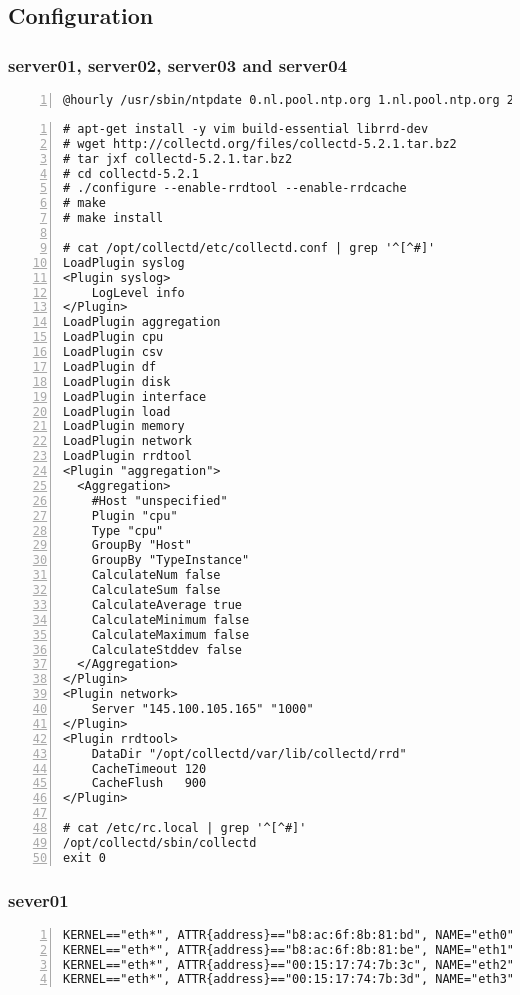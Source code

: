 \documentclass[Configuration]{subfiles}
\begin{document}
\newpage
\subsection{Configuration}
\label{sec:Configuration}

\subsubsection{server01, server02, server03 and server04}
\begin{lstlisting}[frame=single,caption=cronjob -l ,backgroundcolor=\color{gray},breaklines=true,numbers=left,]
@hourly /usr/sbin/ntpdate 0.nl.pool.ntp.org 1.nl.pool.ntp.org 2.nl.pool.ntp.org 3.nl.pool.ntp.org
\end{lstlisting}

\begin{lstlisting}[frame=single,caption=Collectd,backgroundcolor=\color{gray},breaklines=true,numbers=left,]
# apt-get install -y vim build-essential librrd-dev
# wget http://collectd.org/files/collectd-5.2.1.tar.bz2
# tar jxf collectd-5.2.1.tar.bz2
# cd collectd-5.2.1
# ./configure --enable-rrdtool --enable-rrdcache
# make 
# make install 

# cat /opt/collectd/etc/collectd.conf | grep '^[^#]'
LoadPlugin syslog
<Plugin syslog>
    LogLevel info
</Plugin>
LoadPlugin aggregation
LoadPlugin cpu
LoadPlugin csv
LoadPlugin df
LoadPlugin disk
LoadPlugin interface
LoadPlugin load
LoadPlugin memory
LoadPlugin network
LoadPlugin rrdtool
<Plugin "aggregation">
  <Aggregation>
    #Host "unspecified"
    Plugin "cpu"
    Type "cpu"
    GroupBy "Host"
    GroupBy "TypeInstance"
    CalculateNum false
    CalculateSum false
    CalculateAverage true
    CalculateMinimum false
    CalculateMaximum false
    CalculateStddev false
  </Aggregation>
</Plugin>
<Plugin network>
    Server "145.100.105.165" "1000"
</Plugin> 
<Plugin rrdtool>
    DataDir "/opt/collectd/var/lib/collectd/rrd"
    CacheTimeout 120
    CacheFlush   900
</Plugin>

# cat /etc/rc.local | grep '^[^#]'
/opt/collectd/sbin/collectd
exit 0
\end{lstlisting}

\subsubsection{sever01}
\label{sec:server01_configuration}

\begin{lstlisting}[frame=single,caption=/etc/udev/rules.d/70-persistent-net.rules,backgroundcolor=\color{gray},breaklines=true,numbers=left,]
KERNEL=="eth*", ATTR{address}=="b8:ac:6f:8b:81:bd", NAME="eth0"
KERNEL=="eth*", ATTR{address}=="b8:ac:6f:8b:81:be", NAME="eth1"
KERNEL=="eth*", ATTR{address}=="00:15:17:74:7b:3c", NAME="eth2"
KERNEL=="eth*", ATTR{address}=="00:15:17:74:7b:3d", NAME="eth3"
\end{lstlisting}
\end{document}
